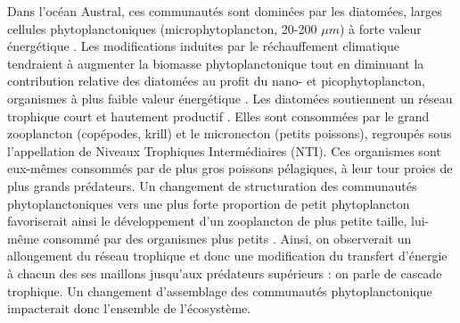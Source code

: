 Dans l'océan Austral, ces communautés sont dominées par les diatomées, larges cellules phytoplanctoniques (microphytoplancton, 20-200 $\mu m$) à forte valeur énergétique \cite{treguer1992} \cite{heidemann2024drivers}. Les modifications induites par le réchauffement climatique tendraient à augmenter la biomasse phytoplanctonique \cite{delcastillo2019greener} \cite{adroli2026} tout en diminuant la contribution relative des diatomées au profit du nano- et picophytoplancton, organismes à plus faible valeur énergétique \cite{krumhardt2022climate}\cite{sari2025influence}. Les diatomées soutiennent un réseau trophique court et hautement productif \cite{treguer1992}. Elles sont consommées par le grand zooplancton (copépodes, krill) et le micronecton (petits poissons), regroupés sous l'appellation de Niveaux Trophiques Intermédiaires (NTI). Ces organismes sont eux-mêmes consommés par de plus gros poissons pélagiques, à leur tour proies de plus grands prédateurs. Un changement de structuration des communautés phytoplanctoniques vers une plus forte proportion de petit phytoplancton favoriserait ainsi le développement d'un zooplancton de plus petite taille, lui-même consommé par des organismes plus petits \cite{krumhardt2022climate}. Ainsi, on observerait un allongement du réseau trophique et donc une modification du transfert d'énergie à chacun des ses maillons jusqu'aux prédateurs supérieurs \cite{mestre2020decadal} : on parle de cascade trophique. Un changement d'assemblage des communautés phytoplanctonique impacterait donc l'ensemble de l'écosystème.


\vspace{0.3cm}

